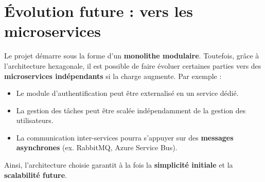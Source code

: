 \section{Évolution future : vers les microservices}
Le projet démarre sous la forme d’un \textbf{monolithe modulaire}. Toutefois, grâce à l’architecture hexagonale, il est possible de faire évoluer certaines parties vers des \textbf{microservices indépendants} si la charge augmente.  
Par exemple :
\begin{itemize}
	\item Le module d’authentification peut être externalisé en un service dédié.
	\item La gestion des tâches peut être scalée indépendamment de la gestion des utilisateurs.
	\item La communication inter-services pourra s’appuyer sur des \textbf{messages asynchrones} (ex. RabbitMQ, Azure Service Bus).
\end{itemize}

Ainsi, l’architecture choisie garantit à la fois la \textbf{simplicité initiale} et la \textbf{scalabilité future}.
